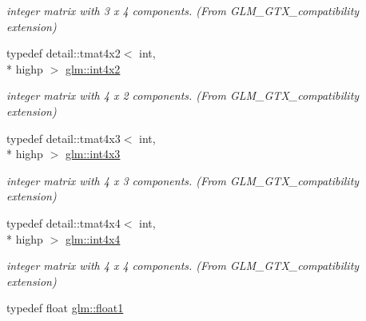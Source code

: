 \begin{DoxyCompactItemize}
\begin{DoxyCompactList}\small\item\em integer matrix with 3 x 4 components. (From G\-L\-M\-\_\-\-G\-T\-X\-\_\-compatibility extension) \end{DoxyCompactList}\item 
\hypertarget{group__gtx__compatibility_gac391157aca117c5d52b10c2c3ca5c9be}{typedef detail\-::tmat4x2$<$ int, \\*
highp $>$ \hyperlink{group__gtx__compatibility_gac391157aca117c5d52b10c2c3ca5c9be}{glm\-::int4x2}}\label{group__gtx__compatibility_gac391157aca117c5d52b10c2c3ca5c9be}

\begin{DoxyCompactList}\small\item\em integer matrix with 4 x 2 components. (From G\-L\-M\-\_\-\-G\-T\-X\-\_\-compatibility extension) \end{DoxyCompactList}\item 
\hypertarget{group__gtx__compatibility_gaa80ec1b785920a08d366b3c09859d888}{typedef detail\-::tmat4x3$<$ int, \\*
highp $>$ \hyperlink{group__gtx__compatibility_gaa80ec1b785920a08d366b3c09859d888}{glm\-::int4x3}}\label{group__gtx__compatibility_gaa80ec1b785920a08d366b3c09859d888}

\begin{DoxyCompactList}\small\item\em integer matrix with 4 x 3 components. (From G\-L\-M\-\_\-\-G\-T\-X\-\_\-compatibility extension) \end{DoxyCompactList}\item 
\hypertarget{group__gtx__compatibility_ga5f8072c2dce67ad49939e12b168d1de1}{typedef detail\-::tmat4x4$<$ int, \\*
highp $>$ \hyperlink{group__gtx__compatibility_ga5f8072c2dce67ad49939e12b168d1de1}{glm\-::int4x4}}\label{group__gtx__compatibility_ga5f8072c2dce67ad49939e12b168d1de1}

\begin{DoxyCompactList}\small\item\em integer matrix with 4 x 4 components. (From G\-L\-M\-\_\-\-G\-T\-X\-\_\-compatibility extension) \end{DoxyCompactList}\item 
\hypertarget{group__gtx__compatibility_gae0ad1b0450320cda98bbbecb56bc3167}{typedef float \hyperlink{group__gtx__compatibility_gae0ad1b0450320cda98bbbecb56bc3167}{glm\-::float1}}\label{group__gtx__compatibility_gae0ad1b0450320cda98bbbecb56bc3167}


\end{DoxyCompactItemize}
